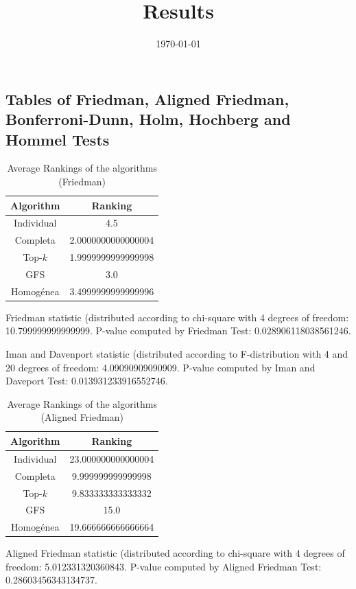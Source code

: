 \documentclass[a4paper,10pt]{article}
\title{Results}
\author{}
\date{\today}
\begin{document}
\begin{landscape}
\oddsidemargin 0in \topmargin 0in\maketitle
\section{Tables of Friedman, Aligned Friedman, Bonferroni-Dunn, Holm, Hochberg and Hommel Tests}
\begin{table}[!htp]
\centering
\caption{Average Rankings of the algorithms (Friedman)
}\begin{tabular}{c|c}
Algorithm&Ranking\\
\hline
Individual&4.5\\
Completa&2.0000000000000004\\
Top-$k$&1.9999999999999998\\
GFS&3.0\\
Homogénea&3.4999999999999996\\
\end{tabular}
\end{table}


Friedman statistic (distributed according to chi-square with 4 degrees of freedom: 10.799999999999999. 
P-value computed by Friedman Test: 0.028906118038561246.\newline

Iman and Davenport statistic (distributed according to F-distribution with 4 and 20 degrees of freedom: 4.09090909090909. 
P-value computed by Iman and Daveport Test: 0.013931233916552746.\newline


\newpage

\begin{table}[!htp]
\centering
\caption{Average Rankings of the algorithms (Aligned Friedman)
}\begin{tabular}{c|c}
Algorithm&Ranking\\
\hline
Individual&23.000000000000004\\
Completa&9.999999999999998\\
Top-$k$&9.833333333333332\\
GFS&15.0\\
Homogénea&19.666666666666664\\
\end{tabular}
\end{table}


Aligned Friedman statistic (distributed according to chi-square with 4 degrees of freedom: 5.012331320360843. 
P-value computed by Aligned Friedman Test: 0.28603456343134737.\newline



\end{landscape}
\end{document}
